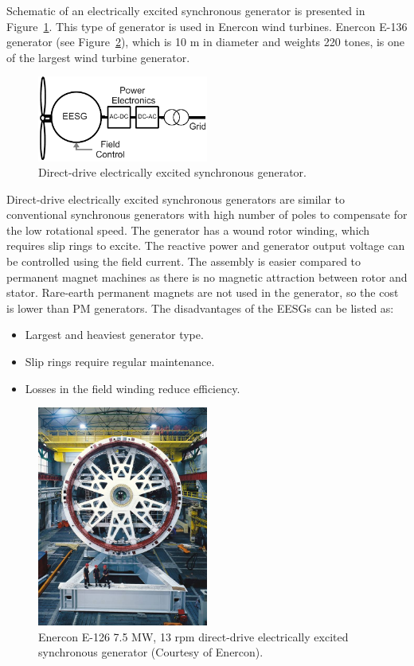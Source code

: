 \documentclass[a4paper, 11pt]{article} %
\begin{document}
Schematic of an electrically excited synchronous generator is presented in Figure~\ref{eesg}. This type of generator is used in Enercon wind turbines. Enercon E-136 generator (see Figure~\ref{enercon}), which is 10 m in diameter and weights 220 tones, is one of the largest wind turbine generator. 

\begin{figure}[h]
    \centering
    \includegraphics[width=0.5\textwidth]{EESG}
    \caption{Direct-drive electrically excited synchronous generator.} 
    \label{eesg}
  \end{figure}

Direct-drive electrically excited synchronous generators are similar to conventional synchronous generators with high number of poles to compensate for the low rotational speed. The generator has a wound rotor winding, which requires slip rings to excite. The reactive power and generator output voltage can be controlled using the field current. The assembly is easier compared to permanent magnet machines as there is no magnetic attraction between rotor and stator. Rare-earth permanent magnets are not used in the generator, so the cost is lower than PM generators. The disadvantages of the EESGs can be listed as:

\begin{itemize}
	\item Largest and heaviest generator type.
	\item Slip rings require regular maintenance.
	\item Losses in the field winding reduce efficiency.
\end{itemize}


  \begin{figure}
    \centering
    \includegraphics[width=0.5\textwidth]{enercon}
    \caption{Enercon E-126 7.5 MW, 13 rpm direct-drive electrically excited synchronous generator (Courtesy of Enercon).} 
    \label{enercon}
  \end{figure}
\end{document}
